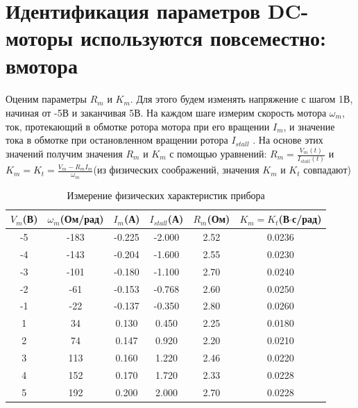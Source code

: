\documentclass[12pt]{article}
\begin{document}
\vfill
\newpage








\section*{Идентификация параметров DC-моторы используются повсеместно: вмотора}
\paragraph{}
Оценим параметры $R_m$ и $K_m$. Для этого будем изменять напряжение с шагом 1В, начиная от -5В и заканчивая 5В. На каждом шаге измерим скорость мотора $\omega_m$,
ток, протекающий в обмотке ротора мотора при его вращении $I_m$, и значение тока в обмотке при остановленном вращении ротора $I_{stall}$ . На основе этих значений получим значения $R_m$ и $K_m$ с помощью уравнений: $R_m = \frac{V_m(t)}{I_{stall}(t)}$ и $K_m = K_t = \frac{V_m - R_mI_m}{\omega_m}$(из физических соображений,
значения $K_m$ и $K_t$ совпадают)\hfill\break
\begin{table}[h]
	
	\label{tab:1}

	\begin{center}
		\begin{tabular}{|c|c|c|c|c|c|}
		\hline
			 \large{$V_m$}\small{(В)} & \large{$\omega_m$}\small{(Ом/рад)} & \large{$I_m$}\small{(А)} & 
			 \large{$I_{stall}$}\small{(А)} & \large{$R_m$}\small{(Ом)} & \large{$K_m = K_t$}\small{(В$\cdot$с/рад)}\\
		\hline
			-5 & -183 & -0.225 & -2.000 & 2.52 & 0.0236\\
			-4 & -143 & -0.204 & -1.600 & 2.55 & 0.0230\\
			-3 & -101 & -0.180 & -1.100 & 2.70 & 0.0240\\
			-2 &  -61 & -0.153 & -0.768 & 2.60 & 0.0250\\
			-1 &  -22 & -0.137 & -0.350 & 2.80 & 0.0260\\
			 1 &   34 &  0.130 &  0.450 & 2.25 & 0.0180\\
			 2 &   74 &  0.147 &  0.920 & 2.20 & 0.0210\\
			 3 &  113 &  0.160 &  1.220 & 2.46 & 0.0220\\
			 4 &  152 &  0.170 &  1.720 & 2.33 & 0.0228\\
			 5 &  192 &  0.200 &  2.000 & 2.70 & 0.0228\\
			
		\hline
		\end{tabular}
	\end{center}
	\caption{Измерение физических характеристик прибора}
\end{table}
\end{document}

